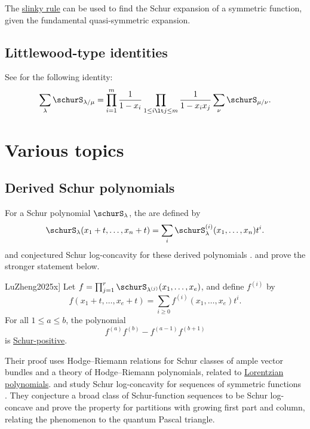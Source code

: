 The \hyperref[gesselSlinkyRule]{slinky rule} can be used to find the Schur expansion
of a symmetric function, given the fundamental quasi-symmetric expansion.


\subsection[skewSchurLittlewood]{Littlewood-type identities}

See \cite{Macdonald1995} for the following identity:
\begin{equation*}
\sum_{\lambda} \schurS_{\lambda/\mu} =
\prod_{i=1}^m \frac{1}{1-x_i}  \prod_{1 \leq i \lt j \leq m} \frac{1}{1-x_ix_j}
\sum_{\nu} \schurS_{\mu/\nu}.
\end{equation*}


\section[schurSVarious]{Various topics}

\subsection[derivedSchur]{Derived Schur polynomials}

For a Schur polynomial $\schurS_\lambda$, the \label{derivedSchurPolynomial} are defined by
\[
\schurS_\lambda(x_1+t,\dotsc,x_n+t)
  = \sum_i \schurS_\lambda^{(i)}(x_1,\dotsc,x_n)t^i.
\]
 and  conjectured Schur log-concavity
for these derived polynomials \cite{RossWu2024x}.
 and  prove the stronger statement below.

\begin{theorem}[Lu--Zheng, \cite[Cor.~1.12]{LuZheng2025x}]
Let $f=\prod_{j=1}^r\schurS_{\lambda^{(j)}}(x_1,\dotsc,x_e)$, and define
$f^{(i)}$ by
\[
 f(x_1+t,\dotsc,x_e+t)=\sum_{i\geq0}f^{(i)}(x_1,\dotsc,x_e)t^i.
\]
For all $1\leq a\leq b$, the polynomial
\[
 f^{(a)}f^{(b)}-f^{(a-1)}f^{(b+1)}
\]
is \hyperref[schurPositivity]{Schur-positive}.
\end{theorem}

Their proof uses Hodge--Riemann relations for Schur classes of ample vector
bundles and a theory of Hodge--Riemann polynomials, related to
\hyperref[lorentzianPolynomial]{Lorentzian polynomials}.
 and  study Schur
log-concavity for sequences of symmetric functions
\cite{GutierrezKrattenthaler2025SchurLogConcavity}.  They conjecture a broad
class of Schur-function sequences to be Schur log-concave and prove the
property for partitions with growing first part and column, relating the
phenomenon to the quantum Pascal triangle.


